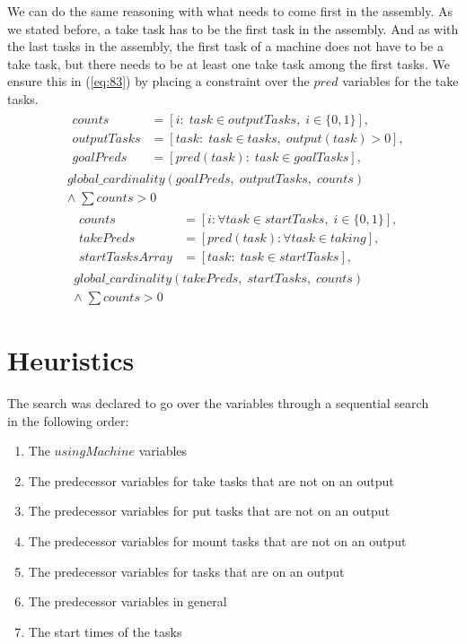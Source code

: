    We can do the same reasoning with what needs to come first in the assembly. As we stated before, a take task has to be the first task in the assembly. And as with the last tasks in the assembly, the first task of a machine does not have to be a take task, but there needs to be at least one take task among the first tasks. We ensure this in (\ref{eq:83}) by placing a constraint over the $pred$ variables for the take tasks.
  \begin{equation}
  \begin{aligned}\label{eq:82}
  &\begin{aligned}
  counts &= [i : \; task \in outputTasks, \; i \in \{0, 1\}], \\
  outputTasks &= [task : \; task \in tasks, \; output(task) > 0], \\
  goalPreds &= [pred(task) : \; task \in goalTasks],
  \end{aligned} \\
  &global\_cardinality(goalPreds, \; outputTasks, \; counts)\\
  &\land \; \sum counts > 0
  \end{aligned}
  \end{equation}
   \begin{equation}
   \begin{aligned}\label{eq:83}
   &\begin{aligned}
   counts &= [i : \forall task \in startTasks, \; i \in \{0, 1\}], \\
   takePreds &= [pred(task) : \forall task \in taking], \\
   startTasksArray &= [task : \; task \in startTasks], 
   \end{aligned}\\
   &global\_cardinality(takePreds, \; startTasks, \; counts) \\
   &\land \; \sum counts > 0
   \end{aligned}
   \end{equation}
   
   \section{Heuristics}
   The search was declared to go over the variables through a sequential search\\\cite{mz_tute} in the following order:
   
   \begin{enumerate}
   \item The $usingMachine$ variables
   \item The predecessor variables for take tasks that are not on an output
   \item The predecessor variables for put tasks that are not on an output
   \item The predecessor variables for mount tasks that are not on an output
   \item The predecessor variables for tasks that are on an output
   \item The predecessor variables in general
   \item The start times of the tasks
   \end{enumerate}
   
